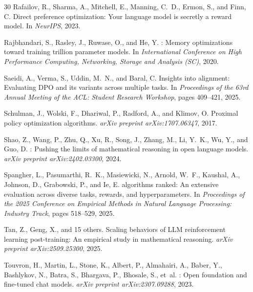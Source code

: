 \documentclass{article}
\begin{document}
\begin{thebibliography}{30}
Rafailov, R., Sharma, A., Mitchell, E., Manning, C.~D., Ermon, S., and Finn, C.
\newblock Direct preference optimization: Your language model is secretly a reward model.
\newblock In \emph{NeurIPS}, 2023.

Rajbhandari, S., Rasley, J., Ruwase, O., and He, Y.
: Memory optimizations toward training trillion parameter models.
\newblock In \emph{International Conference on High Performance Computing, Networking, Storage and Analysis (SC)}, 2020.

Saeidi, A., Verma, S., Uddin, M.~N., and Baral, C.
\newblock Insights into alignment: Evaluating {DPO} and its variants across multiple tasks.
\newblock In \emph{Proceedings of the 63rd Annual Meeting of the ACL: Student Research Workshop}, pages 409--421, 2025.

Schulman, J., Wolski, F., Dhariwal, P., Radford, A., and Klimov, O.
\newblock Proximal policy optimization algorithms.
\newblock \emph{arXiv preprint arXiv:1707.06347}, 2017.

Shao, Z., Wang, P., Zhu, Q., Xu, R., Song, J., Zhang, M., Li, Y.~K., Wu, Y., and Guo, D.
: Pushing the limits of mathematical reasoning in open language models.
\newblock \emph{arXiv preprint arXiv:2402.03300}, 2024.

Spangher, L., Pasumarthi, R.~K., Masiewicki, N., Arnold, W.~F., Kaushal, A., Johnson, D., Grabowski, P., and Ie, E.
 algorithms ranked: An extensive evaluation across diverse tasks, rewards, and hyperparameters.
\newblock In \emph{Proceedings of the 2025 Conference on Empirical Methods in Natural Language Processing: Industry Track}, pages 518--529, 2025.

Tan, Z., Geng, X., and 15 others.
\newblock Scaling behaviors of {LLM} reinforcement learning post-training: An empirical study in mathematical reasoning.
\newblock \emph{arXiv preprint arXiv:2509.25300}, 2025.

Touvron, H., Martin, L., Stone, K., Albert, P., Almahairi, A., Baber, Y., Bashlykov, N., Batra, S., Bhargava, P., Bhosale, S., et~al.
: Open foundation and fine-tuned chat models.
\newblock \emph{arXiv preprint arXiv:2307.09288}, 2023.


\end{thebibliography}
\end{document}
